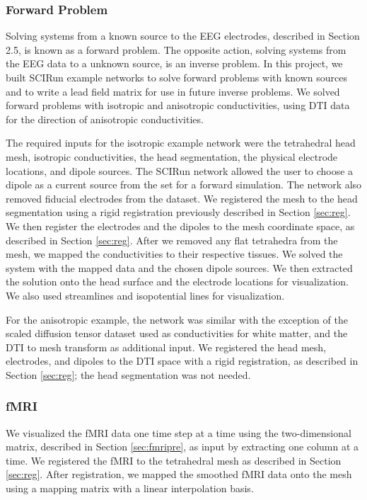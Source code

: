 \subsubsection{Forward Problem}

Solving systems from a known source to the EEG electrodes, described in Section 2.5, is known as a forward problem. The opposite action, solving systems from the EEG data to a unknown source, is an inverse problem.  In this project, we built SCIRun example networks to solve forward problems with known sources and to write a lead field matrix for use in future inverse problems. We solved forward problems with isotropic and anisotropic conductivities, using DTI data for the direction of anisotropic conductivities.

The required inputs for the isotropic example network were the tetrahedral head mesh, isotropic conductivities, the head segmentation, the physical electrode locations, and dipole sources. The SCIRun network allowed the user to choose a dipole as a current source from the set for a forward simulation. The network also removed fiducial electrodes from the dataset. We registered the mesh to the head segmentation using a rigid registration previously described in Section \ref{sec:reg}. We then register the electrodes and the dipoles to the mesh coordinate space, as described in Section \ref{sec:reg}. After we removed any flat tetrahedra from the mesh, we mapped the conductivities to their respective tissues. We solved the system with the mapped data and the chosen dipole sources. We then extracted the solution onto the head surface and the electrode locations for visualization. We also used streamlines and isopotential lines for visualization.

For the anisotropic example, the network was similar with the exception of the scaled diffusion tensor dataset used as conductivities for white matter, and the DTI to mesh transform as additional input. We registered the head mesh, electrodes, and dipoles to the DTI space with a rigid registration, as described in Section \ref{sec:reg}; the head segmentation was not needed.

\subsubsection{fMRI}

We visualized the fMRI data one time step at a time using the two-dimensional matrix, described in Section \ref{sec:fmripre}, as input by extracting one column at a time. We registered the fMRI to the tetrahedral mesh as described in Section \ref{sec:reg}. After registration, we mapped the smoothed fMRI data onto the mesh using a mapping matrix with a linear interpolation basis.

